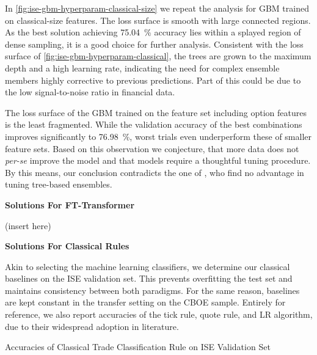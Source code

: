 In \cref{fig:ise-gbm-hyperparam-classical-size} we repeat the analysis for \gls{GBM} trained on classical-size features. The loss surface is smooth with large connected regions. As the best solution achieving \SI{75.04}{\percent} accuracy lies within a splayed region of dense sampling, it is a good choice for further analysis. Consistent with the loss surface of \cref{fig:ise-gbm-hyperparam-classical}, the trees are grown to the maximum depth and a high learning rate, indicating the need for complex ensemble members highly corrective to previous predictions. Part of this could be due to the low signal-to-noise ratio in financial data.

The loss surface of the \gls{GBM} trained on the feature set including option features is the least fragmented. While the validation accuracy of the best combinations improves significantly to \SI{76.98}{\percent}, worst trials even underperform these of smaller feature sets. Based on this observation we conjecture, that more data does not \emph{per-se} improve the model and that models require a thoughtful tuning procedure. By this means, our conclusion contradicts the one of \textcite[][14]{ronenMachineLearningTrade2022}, who find no advantage in tuning tree-based ensembles.


\textbf{Solutions For FT-Transformer}

(insert here)

\textbf{Solutions For Classical Rules}

Akin to selecting the machine learning classifiers, we determine our classical baselines on the \gls{ISE} validation set. This prevents overfitting the test set and maintains consistency between both paradigms. For the same reason, baselines are kept constant in the transfer setting on the \gls{CBOE} sample. Entirely for reference, we also report accuracies of the tick rule, quote rule, and \gls{LR} algorithm, due to their widespread adoption in literature.

\begin{table}[H]
    \centering
    \caption[Accuracies of Classical Trade Classification Rule on  Validation Set]{Accuracies of Classical Trade Classification Rule on \gls{ISE} Validation Set}
    \label{tab:ise-classical-hyperparam-classical-size}
    
\end{table}


